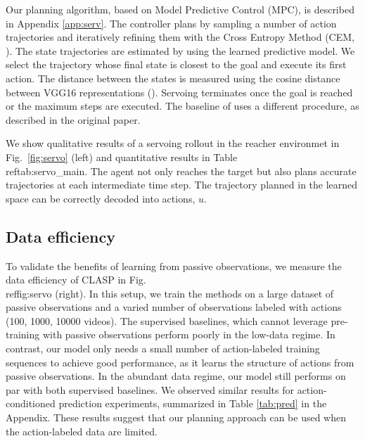 \documentclass{article} %
\begin{document}
Our planning algorithm, based on Model Predictive Control (MPC), is described %
in Appendix \ref{app:serv}. %
The controller plans by sampling a number of action trajectories and iteratively refining them with the Cross Entropy Method (CEM, \cite{blossom2006cross}). The state trajectories are estimated by using the learned predictive model. %
We select the trajectory whose final state is closest to the goal and execute its first action.
The distance between the states is measured using the cosine distance between VGG16 representations (\cite{simonyan2014}). Servoing  terminates once the goal is reached or the maximum %
steps are executed. The baseline of \cite{agrawal2016learning} uses a different procedure, as described in the original paper.


We show qualitative results of a servoing rollout in the reacher environmet in Fig.\ \ref{fig:servo} (left)  and quantitative results in Table\\ref{tab:servo_main}. %
The agent not only reaches the target but also plans accurate trajectories at each intermediate time step. The trajectory planned in the learned space can be correctly decoded into actions, $u$.

\subsection{Data efficiency}
\label{sec:data_efficiency}
To validate the benefits of learning from passive observations, we measure the data efficiency of CLASP in Fig.\\ref{fig:servo} (right). In this setup, we train the methods on a large dataset of passive observations and a varied number of observations labeled with actions (100, 1000, 10000 videos). The supervised baselines, which cannot leverage pre-training with passive observations perform poorly in the low-data regime. In contrast, our model only needs a small number of action-labeled training sequences to achieve good performance, as it learns the structure of actions from passive observations. In the abundant data regime, our model still performs on par with both supervised baselines. We observed similar results for action-conditioned prediction experiments, summarized in Table \ref{tab:pred} in the Appendix. These results suggest that our planning approach can be used when the action-labeled data are limited.
\end{document}
